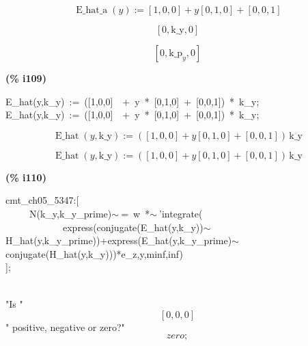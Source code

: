 \documentclass[fleqn]{article}
\begin{document}
\[\tag{\% o105} 
\operatorname{E\_ hat\_ a}(y)\operatorname{:=}\left[ 1\operatorname{,}0\operatorname{,}0\right] +y \left[ 0\operatorname{,}1\operatorname{,}0\right] +\left[ 0\operatorname{,}0\operatorname{,}1\right] \mbox{}\]

\[\tag{\% o106} 
\left[ 0\operatorname{,}\ensuremath{\mathrm{k\_ y}}\operatorname{,}0\right] \mbox{}\]

\[\tag{\% o107} 
\left[ 0\operatorname{,}{{\ensuremath{\mathrm{k\_ p}}}_y}\operatorname{,}0\right] \mbox{}
\]


\noindent
\begin{minipage}[t]{4.000000em}\color{red}\bfseries
(\% i109)	
\end{minipage}
\begin{minipage}[t]{\textwidth}\color{blue}
E\_hat(y,k\_y)\ :=\ ([1,0,0]\ \ +\ y\ *\ [0,1,0]\ +\ [0,0,1])\ *\ k\_y;\\
E\_hat(y,k\_y)\ :=\ ([1,0,0]\ \ +\ y\ *\ [0,1,0]\ +\ [0,0,1])\ *\ k\_y;
\end{minipage}
\[\displaystyle \tag{\% o108} 
\operatorname{E\_ hat}\left( y\operatorname{,}\ensuremath{\mathrm{k\_ y}}\right) \operatorname{:=}\left( \left[ 1\operatorname{,}0\operatorname{,}0\right] +y \left[ 0\operatorname{,}1\operatorname{,}0\right] +\left[ 0\operatorname{,}0\operatorname{,}1\right] \right) \, \ensuremath{\mathrm{k\_ y
}}\mbox{}\]

\[\tag{\% o109} 
\operatorname{E\_ hat}\left( y\operatorname{,}\ensuremath{\mathrm{k\_ y}}\right) \operatorname{:=}\left( \left[ 1\operatorname{,}0\operatorname{,}0\right] +y \left[ 0\operatorname{,}1\operatorname{,}0\right] +\left[ 0\operatorname{,}0\operatorname{,}1\right] \right) \, \ensuremath{\mathrm{k\_ y}}\mbox{}
\]


\noindent
\begin{minipage}[t]{4.000000em}\color{red}\bfseries
(\% i110)	
\end{minipage}
\begin{minipage}[t]{\textwidth}\color{blue}
cmt\_ch05\_5347:[\\
\ \ \ \ \ N(k\_y,k\_y\_prime)\ensuremath{\sim\ }=\ w\ *\ensuremath{\sim\ }'integrate(\\
\ \ \ \ \ \ \ \ \ \ \ \ express(conjugate(E\_hat(y,k\_y))\ensuremath{\sim\ }H\_hat(y,k\_y\_prime))+express(E\_hat(y,k\_y\_prime)\ensuremath{\sim\ }conjugate(H\_hat(y,k\_y)))*e\_z,y,minf,inf)\ \\
];
\end{minipage}
\mbox{}\\"Is "
\[\displaystyle \left[ 0\operatorname{,}0\operatorname{,}0\right] \mbox{}
\]" positive, negative or zero?"
\[\displaystyle zero;\mbox{}\]
\end{document}

